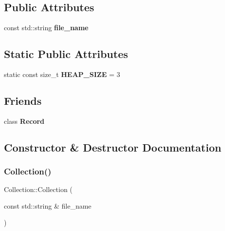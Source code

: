 \subsection*{Public Attributes}
\begin{DoxyCompactItemize}
\item 
\mbox{\label{class_collection_a46d269163d5deac053b484cff176bef2}} 
const std\+::string {\bfseries file\+\_\+name}
\end{DoxyCompactItemize}
\subsection*{Static Public Attributes}
\begin{DoxyCompactItemize}
\item 
\mbox{\label{class_collection_a3b3dc7b32ffc02b446bd7127015b637b}} 
static const size\+\_\+t {\bfseries H\+E\+A\+P\+\_\+\+S\+I\+ZE} = 3
\end{DoxyCompactItemize}
\subsection*{Friends}
\begin{DoxyCompactItemize}
\item 
\mbox{\label{class_collection_a697483987cfb91e205b5be2a8f6752c7}} 
class {\bfseries Record}
\end{DoxyCompactItemize}


\subsection{Constructor \& Destructor Documentation}
\mbox{\label{class_collection_af4c8b62d3038e1ba081aef0c4ebd912d}} 
\subsubsection{\texorpdfstring{Collection()}{Collection()}}
{\footnotesize\ttfamily Collection\+::\+Collection (\begin{DoxyParamCaption}\item[{const std\+::string \&}]{file\+\_\+name }\end{DoxyParamCaption})}

